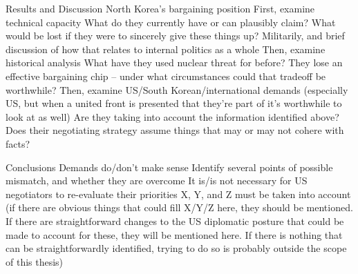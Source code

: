 \documentclass{article}
\begin{document}
\begin{outline}[enumerate]
\1 Results and Discussion
    \2 North Korea’s bargaining position
        \3 First, examine technical capacity
            \4 What do they currently have or can plausibly claim?
            \4 What would be lost if they were to sincerely give these things up? Militarily, and brief discussion of how that relates to internal politics as a whole
        \3 Then, examine historical analysis
            \4 What have they used nuclear threat for before?
            \4 They lose an effective bargaining chip – under what circumstances could that tradeoff be worthwhile?
        \3 Then, examine US/South Korean/international demands (especially US, but when a united front is presented that they’re part of it’s worthwhile to look at as well)
            \4 Are they taking into account the information identified above?
            \4 Does their negotiating strategy assume things that may or may not cohere with facts?

\1 Conclusions
    \2 Demands do/don’t make sense
    \2 Identify several points of possible mismatch, and whether they are overcome
    \2 It is/is not necessary for US negotiators to re-evaluate their priorities
    \2 X, Y, and Z must be taken into account
        \3 (if there are obvious things that could fill X/Y/Z here, they should be mentioned. If there are straightforward changes to the US diplomatic posture that could be made to account for these, they will be mentioned here. If there is nothing that can be straightforwardly identified, trying to do so is probably outside the scope of this thesis)

\end{outline}



\end{document}

